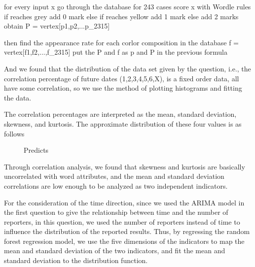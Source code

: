 \documentclass{mcmthesis}
\begin{document}
\begin{python}
for every input x
	go through the database for 243 cases
	score x with Wordle rules
	if reaches grey
		add 0 mark
	else if reaches yellow
		add 1 mark 
	else add 2 marks
	obtain P = vertex[p1,p2,...p\_2315]

	then find the appearance rate for each corlor composition in the database
	f = vertex[f1,f2,...,f\_2315]
	put the P and f as p and P in the previous formula
\end{python}

And we found that the distribution of the data set given by the question, i.e., the correlation percentage of future dates (1,2,3,4,5,6,X), is a fixed order data, all have some correlation, so we use the method of plotting histograms and fitting the data.

The correlation percentages are interpreted as the mean, standard deviation, skewness, and kurtosis. The approximate distribution of these four values is as follows

\begin{figure}[htbp]
\centering    %
\subfigure[] %
{\begin{minipage}{3.3cm}
\centering          %
\texttt{[image: 1]}   %
\end{minipage}
}	
\subfigure [] %
{\begin{minipage}{3.3cm}
\centering      %
\texttt{[image: 2]}   %
\end{minipage}
}
\subfigure[] %
{\begin{minipage}{3.3cm}
\centering          %
\texttt{[image: 3]}   %
\end{minipage}
}
\subfigure[] %
{\begin{minipage}{3.3cm}
\centering          %
\texttt{[image: 4]}   %
\end{minipage}
}
\caption{Predicts} %
\label{fig:1}  %
\end{figure}

Through correlation analysis, we found that skewness and kurtosis are basically uncorrelated with word attributes, and the mean and standard deviation correlations are low enough to be analyzed as two independent indicators.

For the consideration of the time direction, since we used the ARIMA model in the first question to give the relationship between time and the number of reporters, in this question, we used the number of reporters instead of time to influence the distribution of the reported results. Thus, by regressing the random forest regression model, we use the five dimensions of the indicators to map the mean and standard deviation of the two indicators, and fit the mean and standard deviation to the distribution function.
  
\end{document}
